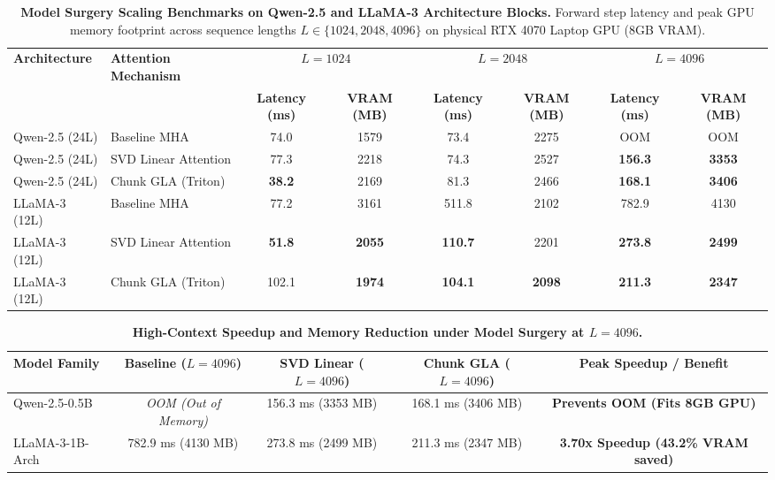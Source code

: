 
\begin{table}[t]
\centering
\small
\caption{\textbf{Model Surgery Scaling Benchmarks on Qwen-2.5 and LLaMA-3 Architecture Blocks.} Forward step latency and peak GPU memory footprint across sequence lengths $L \in \{1024, 2048, 4096\}$ on physical RTX 4070 Laptop GPU (8GB VRAM).}
\label{tab:qwen_llama_surgery}
\begin{tabular}{llcccccc}
\toprule
\textbf{Architecture} & \textbf{Attention Mechanism} & \multicolumn{2}{c}{$L=1024$} & \multicolumn{2}{c}{$L=2048$} & \multicolumn{2}{c}{$L=4096$} \\
\cmidrule(lr){3-4} \cmidrule(lr){5-6} \cmidrule(lr){7-8}
 & & \textbf{Latency (ms)} & \textbf{VRAM (MB)} & \textbf{Latency (ms)} & \textbf{VRAM (MB)} & \textbf{Latency (ms)} & \textbf{VRAM (MB)} \\
\midrule
Qwen-2.5 (24L) & Baseline MHA & 74.0 & 1579 & 73.4 & 2275 & OOM & OOM \\
Qwen-2.5 (24L) & SVD Linear Attention & 77.3 & 2218 & 74.3 & 2527 & \textbf{156.3} & \textbf{3353} \\
Qwen-2.5 (24L) & Chunk GLA (Triton) & \textbf{38.2} & 2169 & 81.3 & 2466 & \textbf{168.1} & \textbf{3406} \\
\midrule
LLaMA-3 (12L) & Baseline MHA & 77.2 & 3161 & 511.8 & 2102 & 782.9 & 4130 \\
LLaMA-3 (12L) & SVD Linear Attention & \textbf{51.8} & \textbf{2055} & \textbf{110.7} & 2201 & \textbf{273.8} & \textbf{2499} \\
LLaMA-3 (12L) & Chunk GLA (Triton) & 102.1 & \textbf{1974} & \textbf{104.1} & \textbf{2098} & \textbf{211.3} & \textbf{2347} \\
\bottomrule
\end{tabular}
\end{table}

\begin{table}[h]
\centering
\small
\caption{\textbf{High-Context Speedup and Memory Reduction under Model Surgery at $L=4096$.}}
\label{tab:qwen_llama_highlights}
\begin{tabular}{lcccc}
\toprule
\textbf{Model Family} & \textbf{Baseline ($L=4096$)} & \textbf{SVD Linear ($L=4096$)} & \textbf{Chunk GLA ($L=4096$)} & \textbf{Peak Speedup / Benefit} \\
\midrule
Qwen-2.5-0.5B & \textit{OOM (Out of Memory)} & 156.3 ms (3353 MB) & 168.1 ms (3406 MB) & \textbf{Prevents OOM (Fits 8GB GPU)} \\
LLaMA-3-1B-Arch & 782.9 ms (4130 MB) & 273.8 ms (2499 MB) & 211.3 ms (2347 MB) & \textbf{3.70x Speedup (43.2\% VRAM saved)} \\
\bottomrule
\end{tabular}
\end{table}
